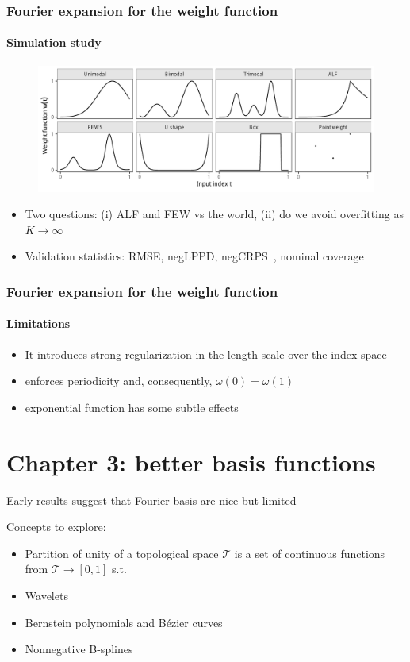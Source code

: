 \documentclass{snedecorbeamer}
\begin{document}
\begin{frame}
  \frametitle{Fourier expansion for the weight function}
  \framesubtitle{Simulation study}

  \begin{figure}
    \centering
    \includegraphics[width=1\textwidth]{syn01-weight-true}
  \end{figure}

  \begin{itemize}
  \item Two questions: (i) ALF and FEW vs the world, (ii) do we avoid
    overfitting as $K\to\infty$
  \item Validation statistics: RMSE, negLPPD, negCRPS~\citep{gneiting2007},
    nominal coverage
  \end{itemize}
\end{frame}

\begin{frame}
  \frametitle{Fourier expansion for the weight function}
  \framesubtitle{Limitations}

  \begin{itemize}
  \item It introduces strong regularization in the length-scale over the index
    space
  \item enforces periodicity and, consequently, $\omega(0) = \omega(1)$
  \item exponential function has some subtle effects
  \end{itemize}

\end{frame}

\section{Chapter 3: better basis functions}

\begin{frame}

  Early results suggest that Fourier basis are nice but limited

  Concepts to explore:
  \begin{itemize}
  \item Partition of unity of a topological space $\mathcal{T}$ is a set of
    continuous functions from $\mathcal{T}\to[0, 1]$ s.t.
  \item Wavelets
  \item Bernstein polynomials and Bézier curves
  \item Nonnegative B-splines
  \end{itemize}
\end{frame}
\end{document}
